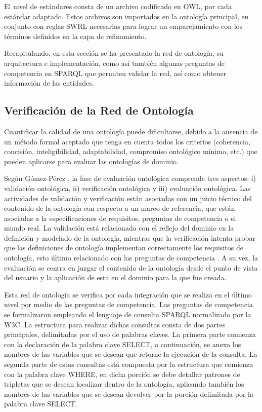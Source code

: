 \documentclass[journal]{IEEEtran}
\begin{document}
El nivel de est\'andares consta de un archivo codificado en OWL, por cada est\'andar adaptado. Estos archivos son importados en la ontolog\'ia principal, en conjunto con reglas SWRL necesarias para lograr un emparejamiento con los t\'erminos definidos en la capa de refinamiento.

Recapitulando, en esta secci\'on se ha presentado la red de ontolog\'ia, su arquitectura e implementaci\'on, como as\'i tambi\'en algunas preguntas de competencia en SPARQL que permiten validar la red, as\'i como obtener informaci\'on de las entidades. 



\subsection{Verificaci\'on de la Red de Ontolog\'ia}

Cuantificar la calidad de una ontolog\'ia puede dificultarse, debido a la ausencia de un método formal aceptado que tenga en cuenta todos los criterios (coherencia, concisi\'on, inteligibilidad, adaptabilidad, compromiso ontol\'ogico m\'inimo, etc.) que pueden aplicarse para evaluar las ontolog\'ias de dominio.

Seg\'un G\'omez-P\'erez \cite{Gomez-Perez2007OntologicalWeb}, la fase de evaluaci\'on ontol\'ogica comprende tres aspectos: i) validaci\'on ontol\'ogica, ii) verificaci\'on ontol\'ogica y iii) evaluaci\'on ontol\'ogica. Las actividades de validaci\'on y verificaci\'on est\'an asociadas con un juicio t\'ecnico del contenido de la ontolog\'ia con respecto a un marco de referencia, que est\'an asociadas a la especificaciones de requisitos, preguntas de competencia o el mundo real. La validaci\'on est\'a relacionada con el reflejo del dominio en la definici\'on y modelado de la ontolog\'ia, mientras que la verificaci\'on intenta probar que las definiciones de ontolog\'ia implementan correctamente los requisitos de ontolog\'ia, esto \'ultimo relacionado con las preguntas de competencia \cite{Bezerra2013EvaluatingQuestions}. A su vez, la evaluaci\'on se centra en juzgar el contenido de la ontolog\'ia desde el punto de vista del usuario y la aplicaci\'on de esta en el dominio para la que fue creada. 

Esta red de ontolog\'ia se verifica por cada integraci\'on que se realiza en el \'ultimo nivel por medio de las preguntas de competencia. Las preguntas de competencia se formalizaron empleando el lenguaje de consulta SPARQL normalizado por la W3C. La estructura para realizar dichas consultas consta de dos partes principales, delimitadas por el uso de palabras claves. La primera parte comienza con la declaraci\'on de la palabra clave SELECT, a continuaci\'on, se anexa los nombres de las variables que se desean que retorne la ejecuci\'on de la consulta. La segunda parte de estas consultas est\'a compuesta por la estructura que comienza con la palabra clave WHERE, en dicha porci\'on se debe detallar patrones de tripletas que se desean localizar dentro de la ontolog\'ia, aplicando tambi\'en los nombres de las variables que se desean devolver por la porci\'on delimitada por la palabra clave SELECT. 
\end{document}

